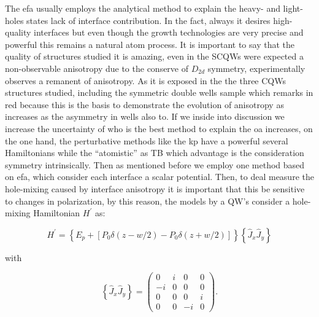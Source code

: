 The \gls{efa} usually employs the analytical method to explain the heavy- and light- holes states lack of interface contribution\cite{xiao2001determination}. In the fact,  always it desires high-quality interfaces but even though the growth technologies are very precise and powerful this remains a natural atom process. It is important to say that the quality of structures studied it is amazing, even in the SCQWs were expected a non-observable anisotropy due to the conserve of $D_{2d}$ symmetry, experimentally observes a remanent of anisotropy. As it is exposed in the  the three  CQWs structures studied, including the symmetric double wells sample which remarks in red because this is the basis to demonstrate the evolution of anisotropy as increases as the asymmetry in wells also to. If we inside into discussion we increase the uncertainty of who is the best method to explain the \gls{oa} increases, on the one hand, the perturbative methods like the \gls{kp} have a powerful several  Hamiltonians while the ``atomistic''  as \gls{TB} which advantage is the consideration symmetry intrinsically. Then as mentioned before we employ one method based on \gls{efa}, which consider each interface a scalar potential\cite{krebs1998inversion,chen2002interface,ivchenko1996heavylight,xiao2001determination}. 
Then, to deal measure the hole-mixing caused by interface  anisotropy it is important that this be sensitive to changes in polarization, by this reason, the models by a \gls{QW}'s consider a hole-mixing Hamiltonian  $H^\prime$ as\cite{ye2001inplane,chen2002interface,xiao2001determination}:

\begin{equation}\label{eqn:chapter-2-sec-anisotropy-model-common-hamiltonian}
	H^{\prime}= \left\lbrace E_{p} + \left[P_{0}\delta\left(z-w/2\right)-P_{0}\delta\left(z+w/2\right)\right]\right\rbrace\left\lbrace \hat{J}_{x}\hat{J}_{y}\right\rbrace
\end{equation}

with

\begin{equation}\label{eqn:chapter-2-sec-anisotropy-model-jotas}
	\left\lbrace \hat{J}_{x}\hat{J}_{y}\right\rbrace=
	\begin{pmatrix}
	0 & i & 0  & 0\\	
   -i & 0 & 0  & 0\\	
	0 & 0 & 0  & i\\	
	0 & 0 & -i & 0
	\end{pmatrix}.
\end{equation}

